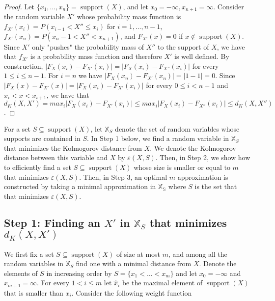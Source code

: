 \documentclass{article}
\DeclareMathOperator{\support}{support}
\begin{document}
	\begin{proof}
		Let $\{x_1,\dots,x_n\} = \support(X)$, and let $x_0 = -\infty, x_{n+1}=\infty$. Consider the random variable $X'$ whose probability mass function is
		$f_{X'}(x_i) = P(x_{i-1} < X'' \leq x_i)$ for $i=1,\dots,n-1$,  $f_{X'}(x_n) = P(x_n-1 < X'' < x_{n+1})$, and $F_{X'}(x)=0$ if $x\notin \support(X)$.  Since $X'$ only "pushes" the probability mass of $X''$ to the support of $X$, we have that $f_{X'}$ is a probability mass function and therefore $X'$ is well defined. 	
		By construction, $|F_{X}(x_i)-F_{X'}(x_i)| = |F_{X}(x_i)-F_{X''}(x_i)|$ for every  $1\leq i\leq n-1$. For $i=n$ we have $|F_{X}(x_n)-F_{X'}(x_n)| = |1-1|=0$.
		Since $|F_{X}(x)-F_{X'}(x)| = |F_{X}(x_i)-F_{X'}(x_i)|$ for every  $0\leq   i < n+1$  and $x_i<x<x_{i+1}$, we have that $d_K(X,X')=max_{i}|F_{X}(x_i)-F_{X'}(x_i)|\leq max_{i}|F_{X}(x_i)-F_{X''}(x_i)|\leq d_K(X,X'')$.
	\end{proof}
	
	
	For a set $S\subseteq \support(X)$, let $\mathbb{X}_S$ denote the set of random variables whose supports are contained in $S$. In Step 1 below, we find a random variable in $\mathbb{X}_S$  that minimizes the Kolmogorov distance from $X$. We denote the Kolmogorov distance between this variable and $X$ by $\varepsilon(X,S)$. Then, in Step 2, we show how to efficiently find a set $S \subseteq \support(X)$ whose size is smaller or equal to $m$ that minimizes $\varepsilon(X,S)$. Then, in Step 3, an optimal $m$-approximation is constructed by taking a minimal approximation in $\mathbb{X_S}$ where $S$ is the set that that minimizes $\varepsilon(X,S)$. 
	
	\subsection*{Step 1: Finding an $X'$ in $\mathbb{X}_S$ that minimizes $d_K(X,X')$}
	
	
	We first fix a set $S\subseteq \support(X)$ of size at most $m$, and among all the random variables in $\mathbb{X}_S$ find one with a minimal distance from $X$. Denote the elements of $S$ in increasing order by $S=\{x_1<\dots<x_m\}$ and let $x_0=-\infty$ and $x_{m+1}=\infty$. For every $1 <  i \leq m$ let $\hat x_i$ be the maximal element of $\support(X)$ that is smaller than $x_i$. Consider the following weight function 
	
\end{document}
